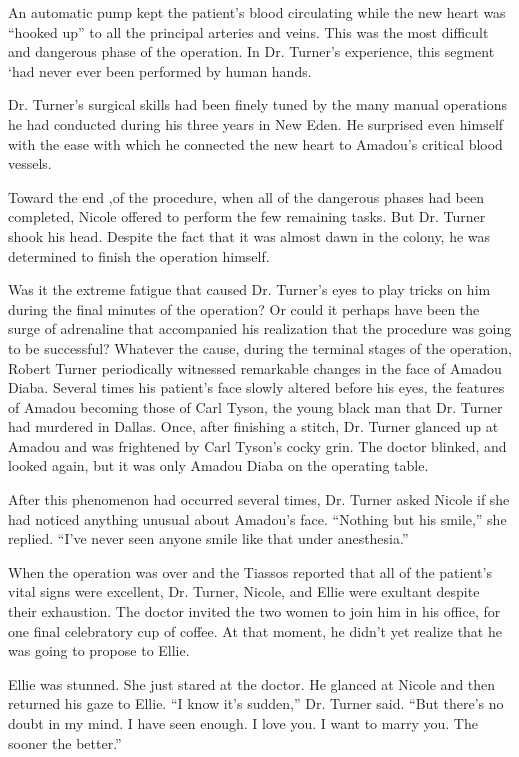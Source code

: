 \documentclass[]{article}
\begin{document}
{An automatic pump kept the patient’s blood circulating while the new heart was “hooked up” to all the principal arteries and veins. This was the most difficult and dangerous phase of the operation. In Dr. Turner’s experience, this segment ‘had never ever been performed by human hands.

Dr. Turner’s surgical skills had been finely tuned by the many manual operations he had conducted during his three years in New Eden. He surprised even himself with the ease with which he connected the new heart to Amadou’s critical blood vessels.

Toward the end ,of the procedure, when all of the dangerous phases had been completed, Nicole offered to perform the few remaining tasks. But Dr. Turner shook his head. Despite the fact that it was almost dawn in the colony, he was determined to finish the operation himself.

Was it the extreme fatigue that caused Dr. Turner’s eyes to play tricks on him during the final minutes of the operation? Or could it perhaps have been the surge of adrenaline that accompanied his realization that the procedure was going to be successful? Whatever the cause, during the terminal stages of the operation, Robert Turner periodically witnessed remarkable changes in the face of Amadou Diaba. Several times his patient’s face slowly altered before his eyes, the features of Amadou becoming those of Carl Tyson, the young black man that Dr. Turner had murdered in Dallas. Once, after finishing a stitch, Dr. Turner glanced up at Amadou and was frightened by Carl Tyson’s cocky grin. The doctor blinked, and looked again, but it was only Amadou Diaba on the operating table.

After this phenomenon had occurred several times, Dr. Turner asked Nicole if she had noticed anything unusual about Amadou’s face. “Nothing but his smile,” she replied. “I’ve never seen anyone smile like that under anesthesia.”

When the operation was over and the Tiassos reported that all of the patient’s vital signs were excellent, Dr. Turner, Nicole, and Ellie were exultant despite their exhaustion. The doctor invited the two women to join him in his office, for one final celebratory cup of coffee. At that moment, he didn’t yet realize that he was going to propose to Ellie.

Ellie was stunned. She just stared at the doctor. He glanced at Nicole and then returned his gaze to Ellie. “I know it’s sudden,” Dr. Turner said. “But there’s no doubt in my mind. I have seen enough. I love you. I want to marry you. The sooner the better.”

}
\end{document}
